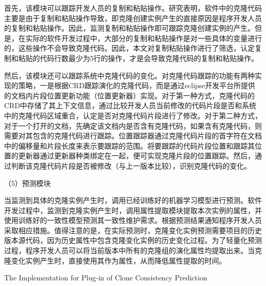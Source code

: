 首先，该模块可以跟踪开发人员的复制和粘贴操作。研究表明，软件中的克隆代码主要是由于复制和粘贴操作导致，即克隆创建实例产生的直接原因是程序开发人员的复制和粘贴操作。因此，监测复制和粘贴操作即可跟踪克隆创建实例的产生。但是，在实际的软件开发过程中，大部分的复制和粘贴操作是对一些具体的变量进行的，这些操作不会导致克隆代码。因此，本文对复制粘贴操作进行了筛选，认定复制和粘贴的代码行数最少为5行的操作，才是会导致克隆代码的复制和粘贴操作。

然后，该模块还可以跟踪系统中克隆代码的变化。对克隆代码跟踪的功能有两种实现的策略，一是根据CRD跟踪演化的克隆代码，而是通过eclipse开发平台所提供的文档内片段位置更新功能（位置更新器）实现。对于第一种方式，克隆代码的CRD中存储了其上下文信息，通过比较开发人员当前修改的代码片段是否和系统中的克隆代码区域重合，认定是否对克隆代码片段进行了修改。对于第二种方式，对于一个打开的文档，先确定该文档内是否含有克隆代码，如果含有克隆代码，则需要对其包含的克隆代码进行跟踪。位置跟踪器通过克隆代码片段的首字符在文档中的偏移量和片段长度来表示要跟踪的范围。将要跟踪的代码片段位置和跟踪其位置的更新器通过更新器种类绑定在一起，便可实现克隆片段的位置跟踪。然后，通过判断该克隆代码片段是否被修改（与上一版本比较），识别克隆代码的变化。

（5）预测模块

当监测到具体的克隆实例产生时，调用已经训练好的机器学习模型进行预测。软件开发过程中，监测到克隆实例产生时，调用属性提取模块提取本次实例的属性，并使用训练好的一致性模型预测其一致性维护需求。根据预测结果通知程序开发人员采取相应措施。值得注意的是，在实际预测时，克隆变化实例预测需要项目的历史版本源代码，因为历史属性中包含克隆变化实例的历史变化过程。为了轻量化预测过程，程序开发人员可以将当前版本中所有的克隆组的演化属性均提取出来。当克隆变化实例产生时，直接使用其作为属性，从而降低属性提取的时间。



{The Implementation for Plug-in of Clone Consistency Prediction}

